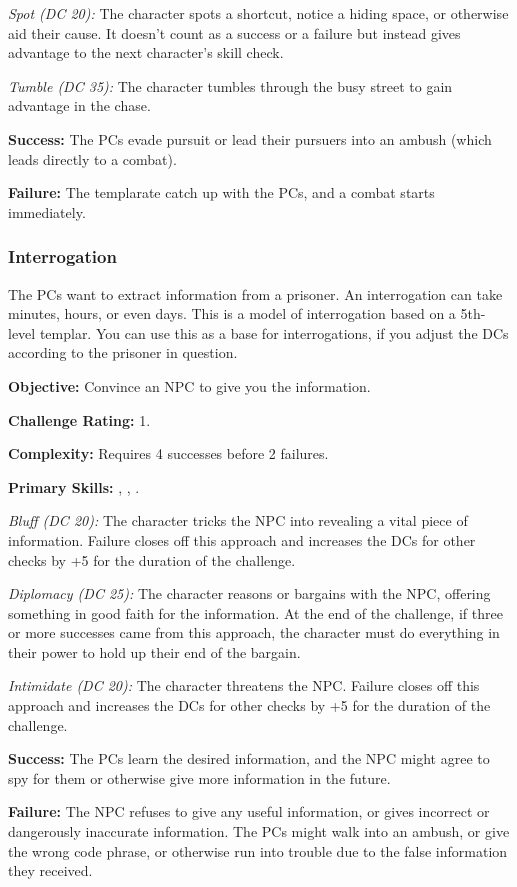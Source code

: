\textit{Spot (DC 20):} The character spots a shortcut, notice a hiding space, or otherwise aid their cause. It doesn't count as a success or a failure but instead gives advantage to the next character's skill check.

\textit{Tumble (DC 35):} The character tumbles through the busy street to gain advantage in the chase.

\textbf{Success:} The PCs evade pursuit or lead their pursuers into an ambush (which leads directly to a combat).

\textbf{Failure:} The templarate catch up with the PCs, and a combat starts immediately.


\subsubsection{Interrogation}
The PCs want to extract information from a prisoner. An interrogation can take minutes, hours, or even days. This is a model of interrogation based on a 5th-level templar. You can use this as a base for interrogations, if you adjust the DCs according to the prisoner in question.

\textbf{Objective:} Convince an NPC to give you the information.

\textbf{Challenge Rating:} 1.

\textbf{Complexity:} Requires 4 successes before 2 failures.

\textbf{Primary Skills:} , , .

\textit{Bluff (DC 20):} The character tricks the NPC into revealing a vital piece of information. Failure closes off this approach and increases the DCs for other checks by +5 for the duration of the challenge.

\textit{Diplomacy (DC 25):} The character reasons or bargains with the NPC, offering something in good faith for the information. At the end of the challenge, if three or more successes came from this approach, the character must do everything in their power to hold up their end of the bargain.

\textit{Intimidate (DC 20):} The character threatens the NPC. Failure closes off this approach and increases the DCs for other checks by +5 for the duration of the challenge.

\textbf{Success:} The PCs learn the desired information, and the NPC might agree to spy for them or otherwise give more information in the future.

\textbf{Failure:} The NPC refuses to give any useful information, or gives incorrect or dangerously inaccurate information. The PCs might walk into an ambush, or give the wrong code phrase, or otherwise run into trouble due to the false information they received.


